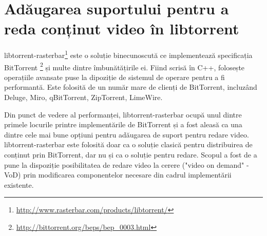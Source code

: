 \section{Adăugarea suportului pentru a reda conținut video în libtorrent}
\label{sec:multimedia-dist:libtorrent}


libtorrent-rasterbar\footnote{\url{http://www.rasterbar.com/products/libtorrent/}}
este o soluție binecunoscută ce implementează specificația BitTorrent
\footnote{\url{http://bittorrent.org/beps/bep\_0003.html}} și multe dintre
îmbunătățirile ei. Fiind scrisă în C++, folosește operațiile avansate puse
la dipoziție de sistemul de operare pentru a fi performantă. Este folosită de
un număr mare de clienți de BitTorrent, incluzând Deluge, Miro, qBitTorrent,
ZipTorrent, LimeWire.

Din punct de vedere al performanței, libtorrent-rasterbar ocupă unul dintre
primele locurile printre implementările de BitTorrent și a fost aleasă ca
una dintre cele mai bune opțiuni pentru adăugarea de suport pentru redare
video. libtorrent-rasterbar este folosită doar ca o soluție clasică pentru
distribuirea de conținut prin BitTorrent, dar nu și ca o soluție pentru
redare. Scopul a fost de a pune la dispoziție posibilitatea de redare video la
cerere ("video on demand" - VoD) prin modificarea componentelor necesare din
cadrul implementării existente.

